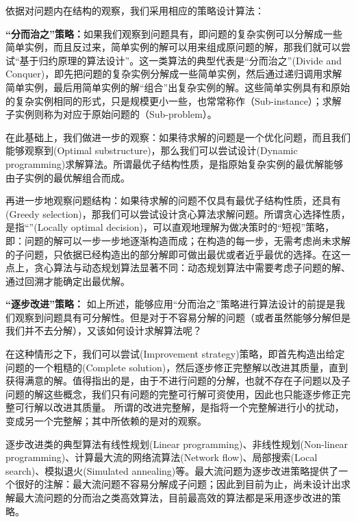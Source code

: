 	依据对问题内在结构的观察，我们采用相应的策略设计算法：
	
	{\bf “分而治之”策略：}如果我们观察到问题具有，即问题的复杂实例可以分解成一些简单实例，而且反过来，简单实例的解可以用来组成原问题的解，那我们就可以尝试“基于归约原理的算法设计”\cite{ManberBook}。这一类算法的典型代表是“分而治之”(Divide and Conquer)，即先把问题的复杂实例分解成一些简单实例，然后通过递归调用求解简单实例，最后用简单实例的解“组合”出复杂实例的解。这些简单实例具有和原始的复杂实例相同的形式，只是规模更小一些，也常常称作（Sub-instance）；求解子实例则称为对应于原始问题的（Sub-problem）。
	
	在此基础上，我们做进一步的观察：如果待求解的问题是一个优化问题，而且我们能够观察到(Optimal substructure)，那么我们可以尝试设计(Dynamic programming)求解算法。所谓最优子结构性质，是指原始复杂实例的最优解能够由子实例的最优解组合而成。
	
	再进一步地观察问题结构：如果待求解的问题不仅具有最优子结构性质，还具有(Greedy selection)，那我们可以尝试设计贪心算法求解问题。所谓贪心选择性质，是指“”(Locally optimal decision)，可以直观地理解为做决策时的“短视”策略，即：问题的解可以一步一步地逐渐构造而成；在构造的每一步，无需考虑尚未求解的子问题，只依据已经构造出的部分解即可做出最优或者近乎最优的选择。在这一点上，贪心算法与动态规划算法显著不同：动态规划算法中需要考虑子问题的解、通过回溯才能确定出最优解。
	
       {\bf “逐步改进”策略：} 如上所述，能够应用“分而治之”策略进行算法设计的前提是我们观察到问题具有可分解性。但是对于不容易分解的问题（或者虽然能够分解但是我们并不去分解），又该如何设计求解算法呢？
       
    在这种情形之下，我们可以尝试(Improvement strategy)策略，即首先构造出给定问题的一个粗糙的(Complete solution)，然后逐步修正完整解以改进其质量，直到获得满意的解。值得指出的是，由于不进行问题的分解，也就不存在子问题以及子问题的解这些概念，我们只有问题的完整可行解可资使用，因此也只能逐步修正完整可行解以改进其质量。 所谓的改进完整解，是指将一个完整解进行小的扰动，变成另一个完整解；其中所依赖的是对的观察。

	逐步改进类的典型算法有线性规划(Linear programming)、非线性规划(Non-linear programming)、计算最大流的网络流算法(Network flow)、局部搜索(Local search)、模拟退火(Simulated annealing)等。最大流问题为逐步改进策略提供了一个很好的注解：最大流问题不容易分解成子问题；因此到目前为止，尚未设计出求解最大流问题的分而治之类高效算法，目前最高效的算法都是采用逐步改进的策略\cite{PapadimitriouBook1982}。

